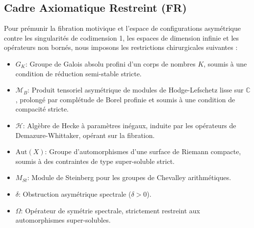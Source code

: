 
\subsection*{Cadre Axiomatique Restreint (FR)}
Pour prémunir la fibration motivique et l'espace de configurations asymétrique contre les singularités de codimension 1, les espaces de dimension infinie et les opérateurs non bornés, nous imposons les restrictions chirurgicales suivantes :
\begin{itemize}
    \item $G_K$: Groupe de Galois absolu profini d'un corps de nombres $K$, soumis à une condition de réduction semi-stable stricte.
    \item $\mathcal{M}_{B}$: Produit tensoriel asymétrique de modules de Hodge-Lefschetz lisse sur $\mathbb{C}$, prolongé par complétude de Borel profinie et soumis à une condition de compacité stricte.
    \item $\mathcal{H}$: Algèbre de Hecke à paramètres inégaux, induite par les opérateurs de Demazure-Whittaker, opérant sur la fibration.
    \item $\text{Aut}(X)$: Groupe d'automorphismes d'une surface de Riemann compacte, soumis à des contraintes de type super-soluble strict.
    \item $M_{St}$: Module de Steinberg pour les groupes de Chevalley arithmétiques.
    \item $\delta$: Obstruction asymétrique spectrale ($\delta > 0$).
    \item $\Omega$: Opérateur de symétrie spectrale, strictement restreint aux automorphismes super-solubles.
\end{itemize}

